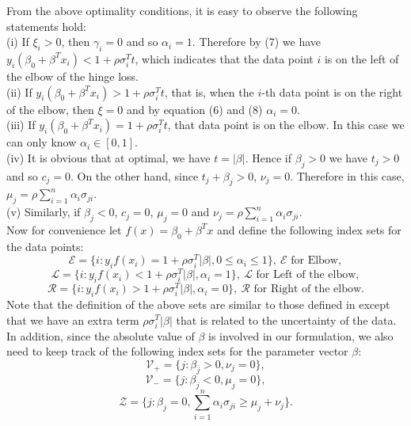 \documentclass[10pt]{article}
\theoremstyle{definition}
\begin{document}
From the above optimality conditions, it is easy to observe the following statements hold:\\
(i) If $\xi_i>0$, then $\gamma_i = 0$ and so $\alpha_i =1$. Therefore by (7) we have $y_i(\beta_0+\beta^Tx_i)<1+\rho \sigma_i^Tt$, which indicates that the data point $i$ is on the left of the elbow of the hinge loss. \\
(ii) If $y_i(\beta_0+\beta^Tx_i)> 1+\rho \sigma_i^Tt$, that is, when the $i$-th data point is on the right of the elbow, then $\xi=0$ and by equation (6) and (8) $\alpha_i =0$. \\
(iii) If $y_i(\beta_0+\beta^Tx_i) =  1+\rho \sigma_i^Tt$, that data point is on the elbow. In this case we can only know $\alpha_i\in[0,1]$.\\
(iv) It is obvious that at optimal, we have $t = |\beta|$. Hence if $\beta_j>0$ we have $t_j>0$ and so $c_j=0$. On the other hand, since $t_j+\beta_j>0$, $\nu_j=0$. Therefore in this case, $\mu_j = \rho \sum_{i=1}^n \alpha_i \sigma_{ji}$.\\
(v) Similarly, if $\beta_j<0$, $c_j=0$, $\mu_j=0$ and $\nu_j = \rho \sum_{i=1}^n \alpha_i \sigma_{ji}$.\\

Now for convenience let $f(x) = \beta_0+\beta^Tx$ and define the following index sets for the data points:
\[\mathcal E = \{i: y_if(x_i) =  1+\rho \sigma_i^T|\beta|, 0\leq\alpha_i\leq1\}, \ \mathcal E \text{ for Elbow},\]
\[\mathcal L = \{i: y_if(x_i) <  1+\rho \sigma_i^T|\beta|, \alpha_i = 1\}, \ \mathcal L \text{ for Left of the elbow},\]
\[\mathcal R = \{i: y_if(x_i) >  1+\rho \sigma_i^T|\beta|,\alpha_i =0 \}, \ \mathcal R \text{ for Right of the elbow}.\]
Note that the definition of the above sets are similar to those defined in \cite{hastie2004entire} except that we have an extra term $\rho \sigma_i^T|\beta|$ that is related to the uncertainty of the data. In addition, since the absolute value of $\beta$ is involved in our formulation, we also need to keep track of the following index sets for the parameter vector $\beta$:
\[\mathcal V_+ = \{j: \beta_j>0, \nu_j=0\},\]
\[\mathcal V_- = \{j: \beta_j<0,\mu_j=0\},\]
\[\mathcal Z = \{j: \beta_j=0,\sum_{i=1}^n \alpha_i \sigma_{ji} \geq \mu_j + \nu_j\}.\]
\end{document}
